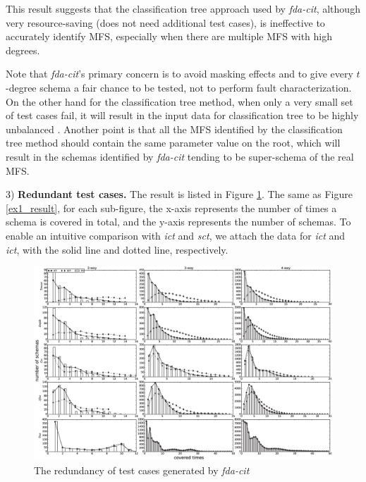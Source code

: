 \documentclass[journal,12pt,onecolumn,draftclsnofoot,]{IEEEtran}
\begin{document}
This result suggests that the classification tree approach used by \emph{fda-cit}, although very resource-saving (does not need additional test cases),  is ineffective to accurately identify MFS, especially when there are multiple MFS with high degrees.

Note that \emph{fda-cit}'s primary concern is to avoid masking effects and to give every $t$-degree schema a fair chance to be tested, not to perform fault characterization. On the other hand for the classification tree method, when only a very small set of test cases fail, it will result in the input data for classification tree to be highly unbalanced \cite{zhang2012faulty}. Another point is that all the MFS identified by the classification tree method should contain the same parameter value on the root, which will result in the schemas identified by \emph{fda-cit} tending to be super-schema of the real MFS.

3) \textbf{Redundant test cases.}
The result is listed in Figure \ref{ex2_result}. The same as Figure \ref{ex1_result}, for each sub-figure, the x-axis represents the number of times a schema is covered in total, and the y-axis represents the number of schemas.  To enable an intuitive comparison with \emph{ict} and \emph{sct}, we attach the data for \emph{ict} and \emph{ict}, with the solid line and dotted line, respectively.

\begin{figure}[htbp]
 \includegraphics[width=7.0in]{ex2.eps}
\caption{The redundancy of test cases generated by \emph{fda-cit}}
\label{ex2_result}
\end{figure}
\end{document}
